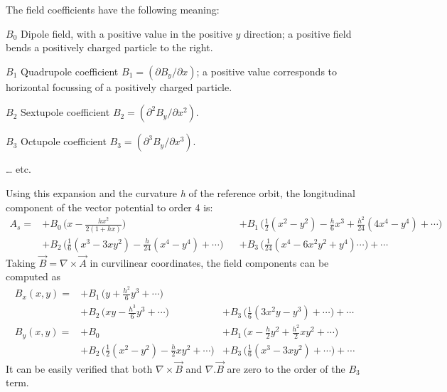 The field coefficients have the following meaning: 
\begin{madlist}
   \item[$B_0$] 
     Dipole field, with a positive value in the
     positive $y$ direction; a positive field bends a positively
     charged particle to the right.  
   \item[$B_1$] 
     Quadrupole coefficient
     \( B_1 = ( \partial B_y / \partial x ) \);
     a positive value corresponds to horizontal focussing of a
     positively charged particle. 
   \item[$B_2$] 
     Sextupole coefficient
     \( B_2 =  ( \partial^2 B_y / \partial x^2 ) \). 
   \item[$B_3$] 
     Octupole coefficient
     \( B_3 =  ( \partial^3 B_y / \partial x^3 ) \). 
   \item[\ldots] etc.
\end{madlist} 

Using this expansion and the curvature \textit{h} of the reference
orbit, the longitudinal component of the vector potential to order 4 is:  
\begin{equation}
\begin{aligned}
A_s =  
&+ B_0\,\Big(x-\frac{hx^2}{2(1+hx)}\Big)&
&+ B_1\,\Big(\frac{1}{2}(x^2-y^2) - \frac{h}{6}x^3 + \frac{h^2}{24}(4x^4-y^4)+\cdots\Big) \\
&+ B_2\,\Big(\frac{1}{6}(x^3-3xy^2) - \frac{h}{24}(x^4-y^4)+\cdots \Big)&
&+ B_3\,\Big(\frac{1}{24}(x^4-6x^2y^2+y^4) \cdots \Big)+\cdots
\end{aligned}
\end{equation}
Taking \(\vec{B} = \nabla \times \vec{A}\) in curvilinear coordinates,
the field components can be computed as  
\begin{equation}
\begin{aligned}
B_x(x,y) = &+ B_1\,\Big(y+\frac{h^2}{6}y^3+\cdots\Big)  &  \\
           &+ B_2\,\Big(xy - \frac{h^3}{6}y^3+\cdots \Big) &+ B_3\,\Big(\frac{1}{6}(3x^2y-y^3)+ \cdots \Big)+\cdots\\
B_y(x,y)=  &+ B_0   &+ B_1\,\Big(x-\frac{h}{2}y^2+\frac{h^2}{2}xy^2+\cdots \Big)\\
           &+ B_2\,\Big(\frac{1}{2}(x^2-y^2)-\frac{h}{2}xy^2+\cdots \Big) &+ B_3\,\Big(\frac{1}{6}(x^3-3xy^2)+ \cdots \Big)+\cdots
\end{aligned}
\end{equation}
It can be easily verified that both \(\nabla \times \vec{B}\)
and \(\nabla . \vec{B}\) are zero to the order of the
\(B_3\) term.  

